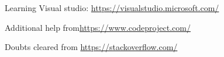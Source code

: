 \cleardoublepage
{}

\begin{thebibliography}{99}


\bibitem{} Learning Visual studio: \url{https://visualstudio.microsoft.com/}

\bibitem{} Additional help from\url{https://www.codeproject.com/}

\bibitem{} Doubts cleared from \url{https://stackoverflow.com/}
\end{thebibliography}

